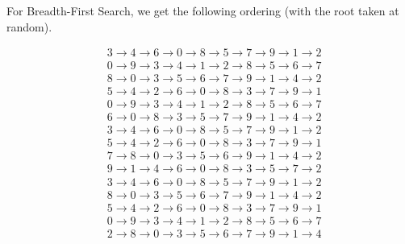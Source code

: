 \documentclass[12pt]{scrartcl}
\begin{document}
\subproblem{}
For Breadth-First Search, we get the following ordering (with the root taken at random).

\begin{align*}
    & 3\rightarrow 4\rightarrow 6\rightarrow 0\rightarrow 8\rightarrow 5\rightarrow 7\rightarrow 9\rightarrow 1\rightarrow 2 \\
    & 0\rightarrow 9\rightarrow 3\rightarrow 4\rightarrow 1\rightarrow 2\rightarrow 8\rightarrow 5\rightarrow 6\rightarrow 7 \\
    & 8\rightarrow 0\rightarrow 3\rightarrow 5\rightarrow 6\rightarrow 7\rightarrow 9\rightarrow 1\rightarrow 4\rightarrow 2 \\
    & 5\rightarrow 4\rightarrow 2\rightarrow 6\rightarrow 0\rightarrow 8\rightarrow 3\rightarrow 7\rightarrow 9\rightarrow 1 \\
    & 0\rightarrow 9\rightarrow 3\rightarrow 4\rightarrow 1\rightarrow 2\rightarrow 8\rightarrow 5\rightarrow 6\rightarrow 7 \\
    & 6\rightarrow 0\rightarrow 8\rightarrow 3\rightarrow 5\rightarrow 7\rightarrow 9\rightarrow 1\rightarrow 4\rightarrow 2 \\
    & 3\rightarrow 4\rightarrow 6\rightarrow 0\rightarrow 8\rightarrow 5\rightarrow 7\rightarrow 9\rightarrow 1\rightarrow 2 \\
    & 5\rightarrow 4\rightarrow 2\rightarrow 6\rightarrow 0\rightarrow 8\rightarrow 3\rightarrow 7\rightarrow 9\rightarrow 1 \\
    & 7\rightarrow 8\rightarrow 0\rightarrow 3\rightarrow 5\rightarrow 6\rightarrow 9\rightarrow 1\rightarrow 4\rightarrow 2 \\
    & 9\rightarrow 1\rightarrow 4\rightarrow 6\rightarrow 0\rightarrow 8\rightarrow 3\rightarrow 5\rightarrow 7\rightarrow 2 \\
    & 3\rightarrow 4\rightarrow 6\rightarrow 0\rightarrow 8\rightarrow 5\rightarrow 7\rightarrow 9\rightarrow 1\rightarrow 2 \\
    & 8\rightarrow 0\rightarrow 3\rightarrow 5\rightarrow 6\rightarrow 7\rightarrow 9\rightarrow 1\rightarrow 4\rightarrow 2 \\
    & 5\rightarrow 4\rightarrow 2\rightarrow 6\rightarrow 0\rightarrow 8\rightarrow 3\rightarrow 7\rightarrow 9\rightarrow 1 \\
    & 0\rightarrow 9\rightarrow 3\rightarrow 4\rightarrow 1\rightarrow 2\rightarrow 8\rightarrow 5\rightarrow 6\rightarrow 7 \\
    & 2\rightarrow 8\rightarrow 0\rightarrow 3\rightarrow 5\rightarrow 6\rightarrow 7\rightarrow 9\rightarrow 1\rightarrow 4
\end{align*}
\end{document}

